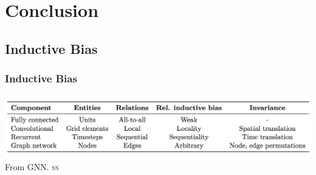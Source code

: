 \documentclass[]{beamer}
\begin{document}
\section{Conclusion}
\subsection{Inductive Bias}
\begin{frame}
    \frametitle{Inductive Bias}
    \includegraphics[scale = 0.25]{inductive-bias.png}
    From GNN\@.
    \textsf{\textsc{ss}}
\end{frame}

\begin{frame}
    \printbibliography{}
\end{frame}
\end{document}
